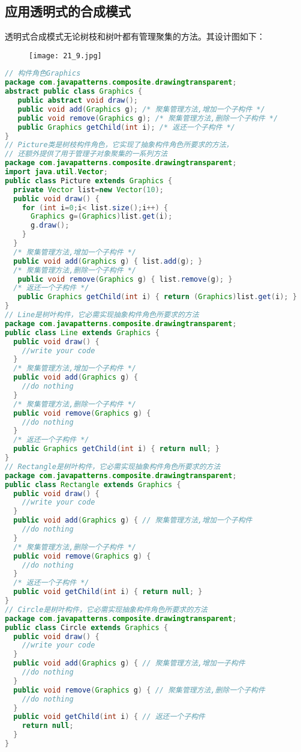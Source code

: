 \documentclass[../main.tex]{subfiles}
\begin{document}
\subsection{应用透明式的合成模式}
透明式合成模式无论树枝和树叶都有管理聚集的方法。其设计图如下：
%
\begin{figure}[H]
  \texttt{[image: 21\_9.jpg]}
\end{figure}
%
\begin{lstlisting}[language=java]
// 构件角色Graphics
package com.javapatterns.composite.drawingtransparent;
abstract public class Graphics {
   public abstract void draw();
   public void add(Graphics g); /* 聚集管理方法,增加一个子构件 */
   public void remove(Graphics g); /* 聚集管理方法,删除一个子构件 */
   public Graphics getChild(int i); /* 返还一个子构件 */
}
// Picture类是树枝构件角色，它实现了抽象构件角色所要求的方法，
// 还额外提供了用于管理子对象聚集的一系列方法
package com.javapatterns.composite.drawingtransparent;
import java.util.Vector;
public class Picture extends Graphics {
  private Vector list=new Vector(10);
  public void draw() {
    for (int i=0;i< list.size();i++) {
      Graphics g=(Graphics)list.get(i);
      g.draw();
    }
  }
  /* 聚集管理方法,增加一个子构件 */
  public void add(Graphics g) { list.add(g); }
  /* 聚集管理方法,删除一个子构件 */
   public void remove(Graphics g) { list.remove(g); }
  /* 返还一个子构件 */
   public Graphics getChild(int i) { return (Graphics)list.get(i); }
}
// Line是树叶构件，它必需实现抽象构件角色所要求的方法
package com.javapatterns.composite.drawingtransparent;
public class Line extends Graphics {
  public void draw() {
    //write your code
  }
  /* 聚集管理方法,增加一个子构件 */
  public void add(Graphics g) {
    //do nothing
  }
  /* 聚集管理方法,删除一个子构件 */
  public void remove(Graphics g) {
    //do nothing
  }
  /* 返还一个子构件 */
  public Graphics getChild(int i) { return null; }
}
// Rectangle是树叶构件，它必需实现抽象构件角色所要求的方法
package com.javapatterns.composite.drawingtransparent;
public class Rectangle extends Graphics {
  public void draw() {
    //write your code
  }
  public void add(Graphics g) { // 聚集管理方法,增加一个子构件
    //do nothing
  }
  /* 聚集管理方法,删除一个子构件 */
  public void remove(Graphics g) {
    //do nothing
  }
  /* 返还一个子构件 */
  public void getChild(int i) { return null; }
}
// Circle是树叶构件，它必需实现抽象构件角色所要求的方法
package com.javapatterns.composite.drawingtransparent;
public class Circle extends Graphics {
  public void draw() {
    //write your code
  }
  public void add(Graphics g) { // 聚集管理方法,增加一子构件
    //do nothing
  }
  public void remove(Graphics g) { // 聚集管理方法,删除一个子构件
    //do nothing
  }
  public void getChild(int i) { // 返还一个子构件
    return null;
  }
}
\end{lstlisting}
%
\end{document}
